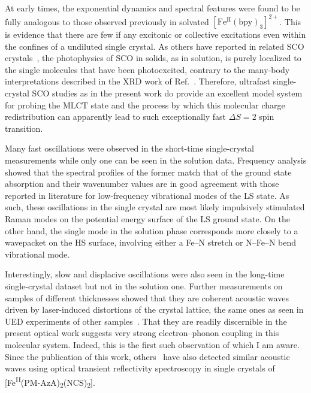 At early times, the exponential dynamics and spectral features were found
to be fully analogous to those observed previously in solvated $\mathrm{[Fe^{II}(bpy)_3]^{2+}}$.
%
This is evidence that there are few if any excitonic or collective excitations
even within the confines of a undiluted single crystal.
As others have reported in related SCO crystals~\cite{Tissot2011, Lorenc2012, Collet2012a,
Collet2012b, Bertoni2016a, Bertoni2016b, Marino2016},
the photophysics of SCO in solids, as in solution,
is purely localized to the single molecules that have been photoexcited,
contrary to the many-body interpretations described in the XRD work of Ref.~\cite{Freyer2013}.
%
Therefore, ultrafast single-crystal SCO studies as in the present work do provide
an excellent model system for probing the $\text{MLCT}$ state and the process by which
this molecular charge redistribution can apparently lead to such exceptionally fast
$\Delta S = 2$ spin transition.

Many fast oscillations were observed in the short-time single-crystal measurements
while only one can be seen in the solution data.
%
Frequency analysis showed that the spectral profiles of the former
match that of the ground state absorption and their wavenumber values are in good agreement
with those reported in literature for low-frequency vibrational modes of the LS state.
As such, these oscillations in the single crystal are most likely
impulsively stimulated Raman modes on the potential energy surface of the LS ground state.
%
On the other hand, the single mode in the solution phase corresponds more closely
to a wavepacket on the HS surface, involving either a Fe--N stretch
or N--Fe--N bend vibrational mode.

Interestingly, slow and displacive oscillations were also seen in
the long-time single-crystal dataset but not in the solution one.
Further measurements on samples of different thicknesses showed that
they are coherent acoustic waves driven by laser-induced distortions
of the crystal lattice, the same ones as seen in UED experiments
of other samples~\cite{Harb2009, Gao2013, Jiang2017}.
%
That they are readily discernible in the present optical work
suggests very strong electron--phonon coupling in this molecular system.
%
Indeed, this is the first such observation of which I am aware.
Since the publication of this work, others~\cite{Parpiiev2017}
have also detected similar acoustic waves using optical transient reflectivity spectroscopy
in single crystals of [Fe\textsuperscript{II}(PM-AzA)\textsubscript{2}(NCS)\textsubscript{2}].

